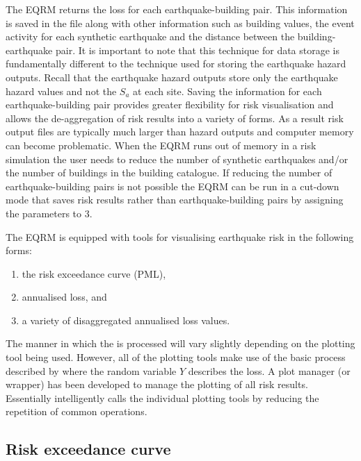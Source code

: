 The EQRM returns the loss for each earthquake-building pair. This
information is saved in the file
 along with
other information such as building values, the event activity for
each synthetic earthquake and the distance between the
building-earthquake pair. It is important to note that this
technique for data storage is fundamentally different to the
technique used for storing the earthquake hazard outputs. Recall
that the earthquake hazard outputs store only the earthquake
hazard values and not the $S_a$ at each site. Saving the
information for each earthquake-building pair provides greater
flexibility for risk visualisation and allows the de-aggregation
of risk results into a variety of forms. As a result risk output
files are typically much larger than hazard outputs and computer
memory can become problematic. When the EQRM runs out of memory in
a risk simulation the user needs to reduce the number of synthetic
earthquakes and/or the number of buildings in the building
catalogue. If reducing the number of earthquake-building pairs is
not possible the EQRM can be run in a cut-down mode that saves
risk results rather than earthquake-building pairs by assigning
the  parameters
 to 3.

The EQRM is equipped with tools for visualising earthquake risk in
the following forms:
\begin{enumerate}
\item the risk exceedance curve (PML), \item annualised loss, and
\item a variety of disaggregated annualised loss values.
\end{enumerate}
The manner in which the
 is processed
will vary slightly depending on the plotting tool being used.
However, all of the plotting tools make use of the basic process
described by  where the
random variable $Y$ describes the loss. A plot manager (or
wrapper)  has been developed to
manage the plotting of all risk results. Essentially
 intelligently calls the
individual plotting tools by reducing the repetition of common
operations.

\subsection{Risk exceedance curve}

